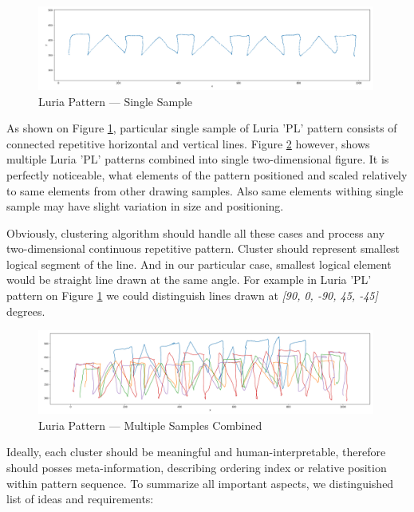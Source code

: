 \begin{figure}[htb]
  \centering
    \includegraphics[width=0.99\textwidth]
        {images/clustering/pl-single}
    \caption{Luria Pattern --- Single Sample}
    \label{luria-single}
\end{figure}

As shown on Figure \ref{luria-single}, particular single sample of Luria 'PL' pattern consists of connected repetitive horizontal and vertical lines. Figure \ref{luria-multiple} however, shows multiple Luria 'PL' patterns combined into single two-dimensional figure. It is perfectly noticeable, what elements of the pattern positioned and scaled relatively to same elements from other drawing samples. Also same elements withing single sample may have slight variation in size and positioning. 

Obviously, clustering algorithm should handle all these cases and  process any two-dimensional continuous repetitive pattern. Cluster should represent smallest logical segment of the line. And in our particular case, smallest logical element would be straight line drawn at the same angle. For example in Luria 'PL' pattern on Figure \ref{luria-single} we could distinguish lines drawn at \textit{[90, 0, -90, 45, -45]} degrees. 

\begin{figure}[htb]
  \centering
    \includegraphics[width=0.99\textwidth]
        {images/clustering/pl-multiple}
    \caption{Luria Pattern --- Multiple Samples Combined}
    \label{luria-multiple}
\end{figure}

Ideally, each cluster should be meaningful and human-interpretable, therefore should posses meta-information, describing ordering index or relative position within pattern sequence. To summarize all important aspects, we distinguished list of ideas and requirements: 

